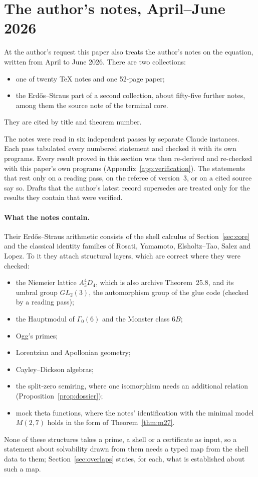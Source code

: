 \section{The author's notes, April--June 2026}\label{sec:notes}

At the author's request this paper also treats the author's notes on the equation, written from April to June 2026. There are two collections:
\begin{itemize}
\item one of twenty \TeX{} notes and one 52-page paper;
\item the Erdős--Straus part of a second collection, about fifty-five further notes, among them the source note of the terminal core.
\end{itemize}
They are cited by title and theorem number.

The notes were read in six independent passes by separate Claude instances. Each pass tabulated every numbered statement and checked it with its own programs. Every result proved in this section was then re-derived and re-checked with this paper's own programs (Appendix~\ref{app:verification}). The statements that rest only on a reading pass, on the referee of version~3, or on a cited source say so. Drafts that the author's latest record supersedes are treated only for the results they contain that were verified.

\paragraph{What the notes contain.}
Their Erdős--Straus arithmetic consists of the shell calculus of Section~\ref{sec:core} and the classical identity families of Rosati, Yamamoto, Elsholtz--Tao, Salez and Lopez. To it they attach structural layers, which are correct where they were checked:
\begin{itemize}
\item the Niemeier lattice $A_5^4D_4$, which is also archive Theorem~25.8, and its umbral group $GL_2(3)$, the automorphism group of the glue code (checked by a reading pass);
\item the Hauptmodul of $\Gamma_0(6)$ and the Monster class $6B$;
\item Ogg's primes;
\item Lorentzian and Apollonian geometry;
\item Cayley--Dickson algebras;
\item the split-zero semiring, where one isomorphism needs an additional relation (Proposition~\ref{prop:dossier});
\item mock theta functions, where the notes' identification with the minimal model $M(2,7)$ holds in the form of Theorem~\ref{thm:m27}.
\end{itemize}
None of these structures takes a prime, a shell or a certificate as input, so a statement about solvability drawn from them needs a typed map from the shell data to them; Section~\ref{sec:overlaps} states, for each, what is established about such a map.

